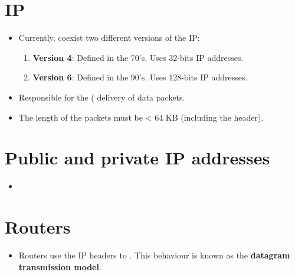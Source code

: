 \section{\gls{IP}}
\begin{itemize}
\item Currently, coexist two different versions of the IP:
  \begin{enumerate}
  \item \textbf{Version 4}: Defined in the 70's. Uses 32-bits IP addresses.
  \item \textbf{Version 6}: Defined in the 90's. Uses 128-bits IP addresses.
  \end{enumerate}
\item Responsible for the ( delivery of data packets.
\item The length of the packets must be < 64 KB (including the header).
\end{itemize}

\section{Public and private IP addresses}
\begin{itemize}
\item
\end{itemize}

\section{Routers}
\begin{itemize} 
\item Routers use the IP headers to . This behaviour is known as the \textbf{datagram
    transmission model}.
\end{itemize}